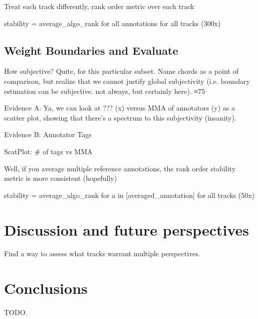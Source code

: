 \documentclass{article}
\begin{document}
Treat each track differently, rank order metric over each track

stability = average\_algo\_rank for all annotations for all tracks (300x)

\subsection{Weight Boundaries and Evaluate}

How subjective? Quite, for this particular subset. Name chords as a point of comparison, but realize that we cannot justify global subjectivity (i.e. boundary estimation can be subjective. not always, but certainly here). ≈75%


Evidence A: Ya, we can look at ??? (x) versus MMA of annotators (y) as a scatter plot, showing that there’s a spectrum to this subjectivity (insanity).

Evidence B: Annotator Tags

ScatPlot: \# of tags vs MMA


Well, if you average multiple reference annotations, the rank order stability metric is more consistent (hopefully)

stability = average\_algo\_rank for a in [averaged\_annotation] for all tracks (50x)	

\section{Discussion and future perspectives}

Find a way to assess what tracks warrant multiple perspectives.

\section{Conclusions}

TODO.


\end{document}
